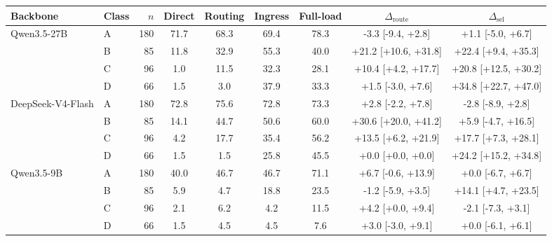 \begin{tabular}{ll r cccc cc}
\toprule
Backbone & Class & $n$ & Direct & Routing & Ingress & Full-load & $\Delta_{\text{route}}$ & $\Delta_{\text{sel}}$ \\
\midrule
Qwen3.5-27B & A & 180 & 71.7 & 68.3 & 69.4 & 78.3 & -3.3 [-9.4, +2.8] & +1.1 [-5.0, +6.7] \\
 & B & 85 & 11.8 & 32.9 & 55.3 & 40.0 & +21.2 [+10.6, +31.8] & +22.4 [+9.4, +35.3] \\
 & C & 96 & 1.0 & 11.5 & 32.3 & 28.1 & +10.4 [+4.2, +17.7] & +20.8 [+12.5, +30.2] \\
 & D & 66 & 1.5 & 3.0 & 37.9 & 33.3 & +1.5 [-3.0, +7.6] & +34.8 [+22.7, +47.0] \\
\midrule
DeepSeek-V4-Flash & A & 180 & 72.8 & 75.6 & 72.8 & 73.3 & +2.8 [-2.2, +7.8] & -2.8 [-8.9, +2.8] \\
 & B & 85 & 14.1 & 44.7 & 50.6 & 60.0 & +30.6 [+20.0, +41.2] & +5.9 [-4.7, +16.5] \\
 & C & 96 & 4.2 & 17.7 & 35.4 & 56.2 & +13.5 [+6.2, +21.9] & +17.7 [+7.3, +28.1] \\
 & D & 66 & 1.5 & 1.5 & 25.8 & 45.5 & +0.0 [+0.0, +0.0] & +24.2 [+15.2, +34.8] \\
\midrule
Qwen3.5-9B & A & 180 & 40.0 & 46.7 & 46.7 & 71.1 & +6.7 [-0.6, +13.9] & +0.0 [-6.7, +6.7] \\
 & B & 85 & 5.9 & 4.7 & 18.8 & 23.5 & -1.2 [-5.9, +3.5] & +14.1 [+4.7, +23.5] \\
 & C & 96 & 2.1 & 6.2 & 4.2 & 11.5 & +4.2 [+0.0, +9.4] & -2.1 [-7.3, +3.1] \\
 & D & 66 & 1.5 & 4.5 & 4.5 & 7.6 & +3.0 [-3.0, +9.1] & +0.0 [-6.1, +6.1] \\
\bottomrule
\end{tabular}